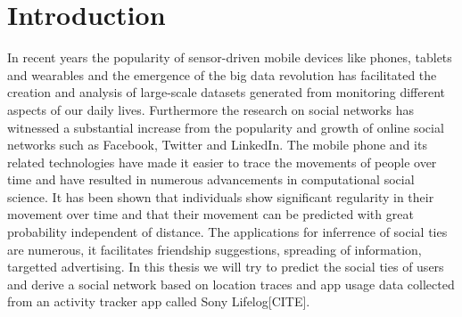 \section{Introduction}
In recent years the popularity of sensor-driven mobile devices like phones, tablets and wearables and the emergence of the big data revolution has facilitated the creation and analysis of large-scale datasets generated from monitoring different aspects of our daily lives\cite{lazer2009life}. Furthermore the research on social networks has witnessed a substantial increase from the popularity and growth of online social networks such as Facebook, Twitter and LinkedIn\cite{social_networks}. The mobile phone and its related technologies have made it easier to trace the movements of people over time and have resulted in numerous advancements in computational social science. It has been shown that individuals show significant regularity in their movement over time\cite{Uihmp} and that their movement can be predicted with great probability independent of distance\cite{LoPiHM}.
The applications for inferrence of social ties are numerous, it facilitates friendship suggestions, spreading of information, targetted advertising.
In this thesis we will try to predict the social ties of users and derive a social network based on location traces and app usage data collected from an activity tracker app called Sony Lifelog[CITE].

